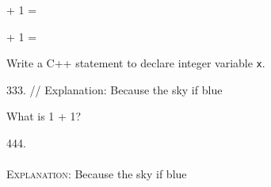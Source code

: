 

\renewcommand\AUTHOR{jdoe5@cougars.ccis.edu} %


\topmattertwo

 + 1 = 

 + 1 = \dotfill{}

\nextq
Write a C++ statement to declare integer variable \verb!x!.
\\
\ANSWER
\begin{answercode}
333.
// Explanation: Because the sky if blue
\end{answercode}

\nextq
What is 1 + 1?
\\
\ANSWER
\begin{answerlong}
444. \\ \mbox{}\\ \textsc{Explanation}: Because the sky if blue
\end{answerlong}

\newpage


